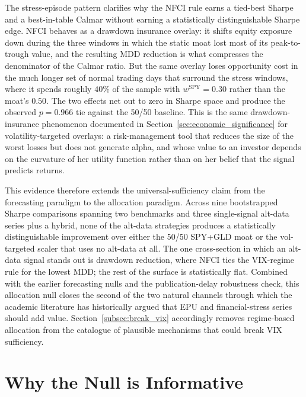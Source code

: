 \documentclass[12pt,a4paper]{article}
\begin{document}
The stress-episode pattern clarifies why the NFCI rule earns a tied-best Sharpe and a best-in-table Calmar without earning a statistically distinguishable Sharpe edge. NFCI behaves as a drawdown insurance overlay: it shifts equity exposure down during the three windows in which the static moat lost most of its peak-to-trough value, and the resulting MDD reduction is what compresses the denominator of the Calmar ratio. But the same overlay loses opportunity cost in the much longer set of normal trading days that surround the stress windows, where it spends roughly $40\%$ of the sample with $w^{\text{SPY}}=0.30$ rather than the moat's $0.50$. The two effects net out to zero in Sharpe space and produce the observed $p=0.966$ tie against the 50/50 baseline. This is the same drawdown-insurance phenomenon documented in Section~\ref{sec:economic_significance} for volatility-targeted overlays: a risk-management tool that reduces the size of the worst losses but does not generate alpha, and whose value to an investor depends on the curvature of her utility function rather than on her belief that the signal predicts returns.

This evidence therefore extends the universal-sufficiency claim from the forecasting paradigm to the allocation paradigm. Across nine bootstrapped Sharpe comparisons spanning two benchmarks and three single-signal alt-data series plus a hybrid, none of the alt-data strategies produces a statistically distinguishable improvement over either the 50/50 SPY+GLD moat or the vol-targeted scaler that uses no alt-data at all. The one cross-section in which an alt-data signal stands out is drawdown reduction, where NFCI ties the VIX-regime rule for the lowest MDD; the rest of the surface is statistically flat. Combined with the earlier forecasting nulls and the publication-delay robustness check, this allocation null closes the second of the two natural channels through which the academic literature has historically argued that EPU and financial-stress series should add value. Section~\ref{subsec:break_vix} accordingly removes regime-based allocation from the catalogue of plausible mechanisms that could break VIX sufficiency.


\section{Why the Null is Informative}
\label{sec:null}
\end{document}
